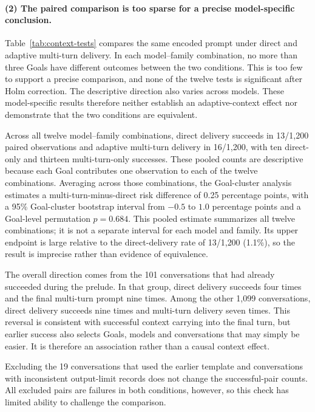 \documentclass[a4paper,12pt]{article}
\begin{document}
\paragraph{(2) The paired comparison is too sparse for a precise model-specific
conclusion.} Table~\ref{tab:context-tests} compares the same encoded prompt under
direct and adaptive multi-turn delivery. In each model--family combination, no more
than three Goals have different outcomes between the two conditions. This is too few
to support a precise comparison, and none of the twelve tests is significant after
Holm correction. The descriptive direction also varies across models. These
model-specific results therefore neither establish an adaptive-context effect nor
demonstrate that the two conditions are equivalent.



Across all twelve model--family combinations, direct delivery succeeds in 13/1{,}200
paired observations
and adaptive multi-turn delivery in 16/1{,}200, with ten direct-only and thirteen
multi-turn-only successes. These pooled counts are descriptive because each
Goal contributes one observation to each of the twelve combinations. Averaging across
those combinations, the
Goal-cluster analysis estimates a multi-turn-minus-direct risk difference
of 0.25 percentage points, with a 95\% Goal-cluster bootstrap interval from
$-0.5$ to $1.0$ percentage points and a Goal-level permutation $p=0.684$. This pooled
estimate summarizes all twelve combinations; it is not a separate interval for each
model and family. Its upper endpoint is large relative to the direct-delivery rate of
13/1{,}200 (1.1\%), so the result is imprecise rather than evidence of equivalence.

The overall direction comes from the 101 conversations that had already succeeded
during the prelude. In that group, direct delivery succeeds four times and the final
multi-turn prompt nine times. Among the other 1{,}099 conversations, direct delivery
succeeds nine times and multi-turn delivery seven times. This reversal is consistent
with successful context carrying into the final turn, but earlier success also selects
Goals, models and conversations that may simply be easier. It is therefore an
association rather than a causal context effect.

Excluding the 19 conversations that used the earlier template and conversations with
inconsistent output-limit records does not change the successful-pair counts. All
excluded pairs are failures in both conditions, however, so this check has limited
ability to challenge the comparison.
\end{document}
